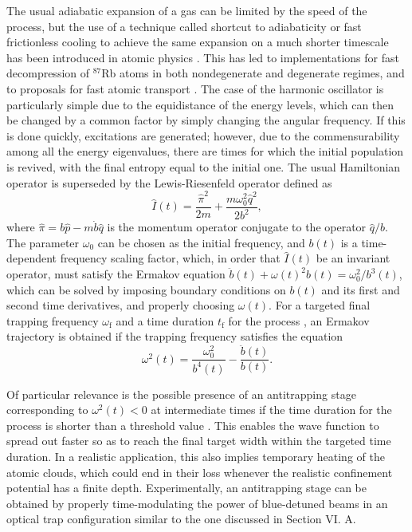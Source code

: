 \documentclass[pra,letterpaper,twocolumn,showpacs,superscriptaddress]{revtex4}
\begin{document}
The usual adiabatic expansion of a gas can be limited by the speed of the process, but the use of a technique called shortcut to adiabaticity 
or fast frictionless cooling to achieve the same expansion on a much shorter timescale has been introduced in atomic physics \cite{Chen2010,Torrontegui2013}. 
This has led to implementations for fast decompression of ${}^{87}$Rb atoms in both nondegenerate \cite{Schaff2010} and degenerate 
\cite{Schaff2011,Schaff2011NJP} regimes, and to proposals for fast atomic transport \cite{Torrontegui2011}.
The case of the harmonic oscillator is particularly simple due to the equidistance of the energy levels, which can then  be changed by a common 
factor by simply changing the angular frequency. If this is done quickly, excitations are generated; however, due to the commensurability 
among all the energy eigenvalues, there are times for which the initial population is revived, with the final entropy equal to the initial one. 
The usual Hamiltonian operator is superseded by the Lewis-Riesenfeld operator defined as \cite{Lewis1967,Lewis1969} 
\begin{equation}
\hat{I}(t)=\frac{\hat{\pi}^2}{2m}+ \frac{m \omega_0^2 \hat{q}^2}{2 b^2},
\end{equation} 
where $\hat{\pi}=b\hat{p}-m \dot{b}\hat{q}$ is the momentum operator conjugate to the operator $\hat{q}/b$. 
The parameter $\omega_0$ can be chosen as the initial frequency, and $b(t)$ is a time-dependent frequency scaling factor, which, in 
order that $\hat{I}(t)$ be an invariant operator, must satisfy the Ermakov equation \cite{Ermakov1880} $\ddot{b}(t) + \omega(t)^2b(t) = \omega_0^2/b^3(t)$,  which 
can be solved by imposing boundary conditions on $b(t)$ and its first and second time derivatives, and properly choosing $\omega(t)$.  
For a targeted final trapping frequency $\omega_{\mathrm f}$ and a time duration $t_{\mathrm f}$ for the process \cite{Chen2010},  an Ermakov trajectory 
is obtained if the trapping frequency satisfies the equation \cite{Chen2010,Torrontegui2013}
\begin{equation}
\omega^2(t) = \frac{\omega_0^2}{b^4(t)} -  \frac{\ddot{b}(t)}{b(t)}.
\end{equation} 

Of particular relevance is the possible presence of an antitrapping stage corresponding to $\omega^2(t)<0$ at intermediate 
times if the time duration for the process is shorter than a threshold value \cite{Chen2010}. This enables the wave function to 
spread out faster so as to reach the final target width within the targeted time duration. In a realistic application, this  
also implies temporary heating of the atomic clouds, which could end in their loss whenever the realistic 
confinement potential has a finite depth. Experimentally, an antitrapping stage can be obtained by properly time-modulating 
the power of  blue-detuned beams in an optical trap configuration similar to the one discussed in Section VI. A. 
\end{document}
